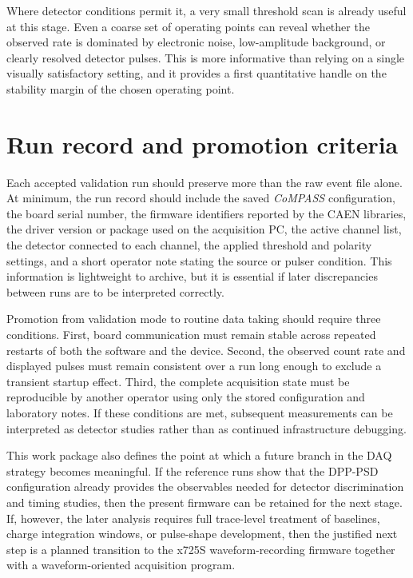 Where detector conditions permit it, a very small threshold scan is already useful at this stage. Even a coarse set of operating points can reveal whether the observed rate is dominated by electronic noise, low-amplitude background, or clearly resolved detector pulses. This is more informative than relying on a single visually satisfactory setting, and it provides a first quantitative handle on the stability margin of the chosen operating point.

\section{Run record and promotion criteria}

Each accepted validation run should preserve more than the raw event file alone. At minimum, the run record should include the saved \textit{CoMPASS} configuration, the board serial number, the firmware identifiers reported by the CAEN libraries, the driver version or package used on the acquisition PC, the active channel list, the detector connected to each channel, the applied threshold and polarity settings, and a short operator note stating the source or pulser condition. This information is lightweight to archive, but it is essential if later discrepancies between runs are to be interpreted correctly.

Promotion from validation mode to routine data taking should require three conditions. First, board communication must remain stable across repeated restarts of both the software and the device. Second, the observed count rate and displayed pulses must remain consistent over a run long enough to exclude a transient startup effect. Third, the complete acquisition state must be reproducible by another operator using only the stored configuration and laboratory notes. If these conditions are met, subsequent measurements can be interpreted as detector studies rather than as continued infrastructure debugging.

This work package also defines the point at which a future branch in the DAQ strategy becomes meaningful. If the reference runs show that the DPP-PSD configuration already provides the observables needed for detector discrimination and timing studies, then the present firmware can be retained for the next stage. If, however, the later analysis requires full trace-level treatment of baselines, charge integration windows, or pulse-shape development, then the justified next step is a planned transition to the x725S waveform-recording firmware together with a waveform-oriented acquisition program.